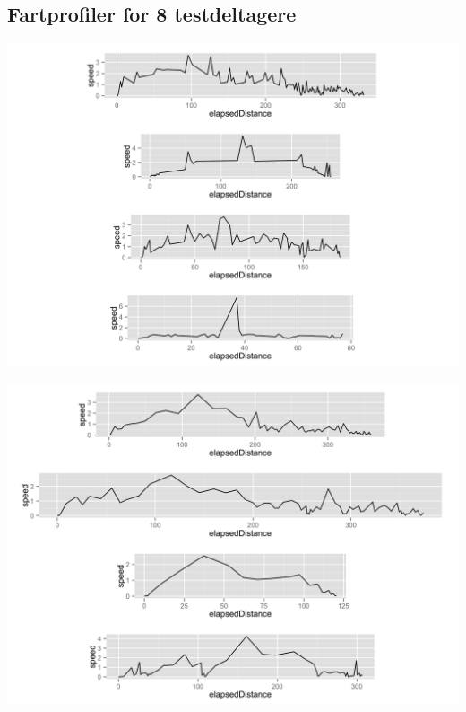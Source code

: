 \begin{appendices}
\chapter{Fartprofiler for 8 testdeltagere}
\label{sec:fart-profil}
\begin{minipage}{\textwidth}
	\begin{minipage}{0.5\linewidth}
		\includegraphics[width=\linewidth]{images/plots/plot_speed_individual_45}
	\end{minipage}
		\begin{minipage}{0.5\linewidth}
		\includegraphics[width=\linewidth]{images/plots/plot_speed_individual_77}
	\end{minipage}
	\begin{minipage}{0.5\linewidth}

\end{minipage}
\end{minipage}
\end{appendices}
